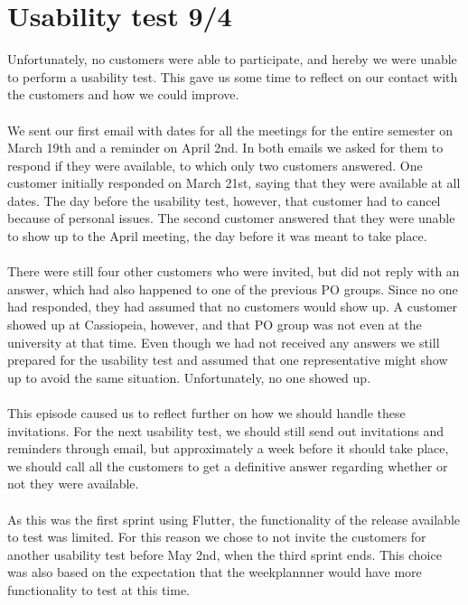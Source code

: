 \section{Usability test 9/4}\label{sprint-2-usability-test}
Unfortunately, no customers were able to participate, and hereby we were unable to perform a usability test.
This gave us some time to reflect on our contact with the customers and how we could improve.
\\\\
We sent our first email with dates for all the meetings for the entire semester on March 19th and a reminder on April 2nd.
In both emails we asked for them to respond if they were available, to which only two customers answered. 
One customer initially responded on March 21st, saying that they were available at all dates. 
The day before the usability test, however, that customer had to cancel because of personal issues.
The second customer answered that they were unable to show up to the April meeting, the day before it was meant to take place.
\\\\
There were still four other customers who were invited, but did not reply with an answer, which had also happened to one of the previous PO groups.
Since no one had responded, they had assumed that no customers would show up.
A customer showed up at Cassiopeia, however, and that PO group was not even at the university at that time. 
Even though we had not received any answers we still prepared for the usability test and assumed that one representative might show up to avoid the same situation.
Unfortunately, no one showed up.
\\\\
This episode caused us to reflect further on how we should handle these invitations.
For the next usability test, we should still send out invitations and reminders through email, but approximately a week before it should take place, we should call all the customers to get a definitive answer regarding whether or not they were available. 
\\\\
As this was the first sprint using Flutter, the functionality of the release available to test was limited. 
For this reason we chose to not invite the customers for another usability test before May 2nd, when the third sprint ends.
This choice was also based on the expectation that the weekplannner would have more functionality to test at this time.
